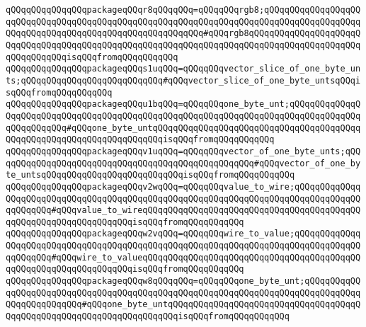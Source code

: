 \verb|qQQqqQQqqQQqqQQqpackageqQQqr8qQQqqQQq=qQQqqQQqrgb8;qQQqqQQqqQQqqQQqqQQqqQQqqQQqqQQqqQQqqQQqqQQqqQQqqQQqqQQqqQQqqQQqqQQqqQQqqQQqqQQqqQQqqQQqqQQqqQQqqQQqqQQqqQQqqQQqqQQqqQQqqQQqqQQq#qQQqrgb8qQQqqQQqqQQqqQQqqQQqqQQqqQQqqQQqqQQqqQQqqQQqqQQqqQQqqQQqqQQqqQQqqQQqqQQqqQQqqQQqqQQqqQQqqQQqqQQqqQQqqQQqisqQQqfromqQQqqQQqqQQq|\newline
\verb|qQQqqQQqqQQqqQQqpackageqQQqs1uqQQq=qQQqqQQqvector_slice_of_one_byte_unts;qQQqqQQqqQQqqQQqqQQqqQQqqQQq#qQQqvector_slice_of_one_byte_untsqQQqisqQQqfromqQQqqQQqqQQq|\newline
\verb|qQQqqQQqqQQqqQQqpackageqQQqu1bqQQq=qQQqqQQqone_byte_unt;qQQqqQQqqQQqqQQqqQQqqQQqqQQqqQQqqQQqqQQqqQQqqQQqqQQqqQQqqQQqqQQqqQQqqQQqqQQqqQQqqQQqqQQqqQQqqQQq#qQQqone_byte_untqQQqqQQqqQQqqQQqqQQqqQQqqQQqqQQqqQQqqQQqqQQqqQQqqQQqqQQqqQQqqQQqqQQqqQQqisqQQqfromqQQqqQQqqQQq|\newline
\verb|qQQqqQQqqQQqqQQqpackageqQQqv1uqQQq=qQQqqQQqvector_of_one_byte_unts;qQQqqQQqqQQqqQQqqQQqqQQqqQQqqQQqqQQqqQQqqQQqqQQqqQQq#qQQqvector_of_one_byte_untsqQQqqQQqqQQqqQQqqQQqqQQqqQQqisqQQqfromqQQqqQQqqQQq|\newline
\verb|qQQqqQQqqQQqqQQqpackageqQQqv2wqQQq=qQQqqQQqvalue_to_wire;qQQqqQQqqQQqqQQqqQQqqQQqqQQqqQQqqQQqqQQqqQQqqQQqqQQqqQQqqQQqqQQqqQQqqQQqqQQqqQQqqQQqqQQqqQQq#qQQqvalue_to_wireqQQqqQQqqQQqqQQqqQQqqQQqqQQqqQQqqQQqqQQqqQQqqQQqqQQqqQQqqQQqqQQqqQQqisqQQqfromqQQqqQQqqQQq|\newline
\verb|qQQqqQQqqQQqqQQqpackageqQQqw2vqQQq=qQQqqQQqwire_to_value;qQQqqQQqqQQqqQQqqQQqqQQqqQQqqQQqqQQqqQQqqQQqqQQqqQQqqQQqqQQqqQQqqQQqqQQqqQQqqQQqqQQqqQQqqQQq#qQQqwire_to_valueqQQqqQQqqQQqqQQqqQQqqQQqqQQqqQQqqQQqqQQqqQQqqQQqqQQqqQQqqQQqqQQqqQQqisqQQqfromqQQqqQQqqQQq|\newline
\verb|qQQqqQQqqQQqqQQqpackageqQQqw8qQQqqQQq=qQQqqQQqone_byte_unt;qQQqqQQqqQQqqQQqqQQqqQQqqQQqqQQqqQQqqQQqqQQqqQQqqQQqqQQqqQQqqQQqqQQqqQQqqQQqqQQqqQQqqQQqqQQqqQQq#qQQqone_byte_untqQQqqQQqqQQqqQQqqQQqqQQqqQQqqQQqqQQqqQQqqQQqqQQqqQQqqQQqqQQqqQQqqQQqqQQqisqQQqfromqQQqqQQqqQQq|\newline
